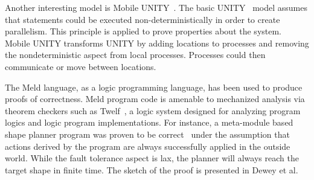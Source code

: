 Another interesting model is Mobile UNITY~\cite{Roman97anintroduction}. The
basic UNITY~\cite{UNITY} model assumes that statements could be executed
non-deterministically in order to create parallelism. This principle is applied
to prove properties about the system.  Mobile UNITY transforms UNITY by adding
locations to processes and removing the nondeterministic aspect from local
processes. Processes could then communicate or move between locations.

The Meld language, as a logic programming language, has been used to produce
proofs of correctness. Meld program code is amenable to mechanized analysis via
theorem checkers such as Twelf~\cite{twelf}, a logic system designed for
analyzing program logics and logic program implementations.  For instance, a
meta-module based shape planner program was proven to be
correct~\cite{dewey-iros08,ashley-rollman-iclp09} under the assumption that
actions derived by the program are always successfully applied in the outside
world.  While the fault tolerance aspect is lax, the planner will always reach
the target shape in finite time.  The sketch of the proof is presented in Dewey
et al.~\cite{dewey-iros08}

